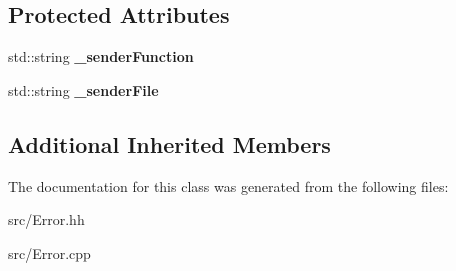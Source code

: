 \subsection*{Protected Attributes}
\begin{DoxyCompactItemize}
\item 
\hypertarget{classstb_1_1Detailed__Error_ae047c633d9b971102ed958bf5d677f08}{std\+::string {\bfseries \+\_\+sender\+Function}}\label{classstb_1_1Detailed__Error_ae047c633d9b971102ed958bf5d677f08}

\item 
\hypertarget{classstb_1_1Detailed__Error_a815e029d575922f2b54bc578d43d9468}{std\+::string {\bfseries \+\_\+sender\+File}}\label{classstb_1_1Detailed__Error_a815e029d575922f2b54bc578d43d9468}

\end{DoxyCompactItemize}
\subsection*{Additional Inherited Members}


The documentation for this class was generated from the following files\+:\begin{DoxyCompactItemize}
\item 
src/Error.\+hh\item 
src/Error.\+cpp\end{DoxyCompactItemize}
